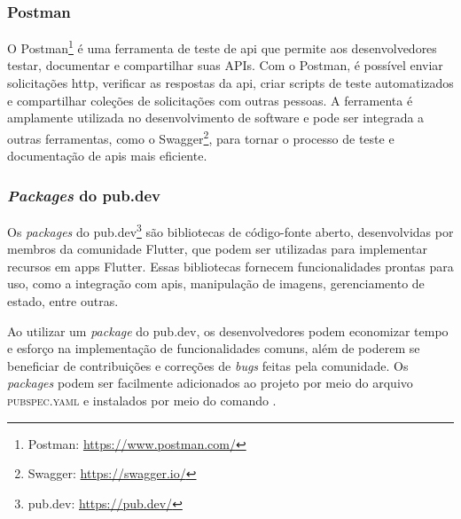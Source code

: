 \subsubsection{Postman}\label{sssec:postman}
O Postman\footnote{\label{postman}Postman: \url{https://www.postman.com/}} é uma ferramenta de teste de \ac{api} que permite aos desenvolvedores testar, documentar e compartilhar suas APIs. Com o Postman, é possível enviar solicitações \ac{http}, verificar as respostas da \ac{api}, criar scripts de teste automatizados e compartilhar coleções de solicitações com outras pessoas. A ferramenta é amplamente utilizada no desenvolvimento de software e pode ser integrada a outras ferramentas, como o Swagger\footnote{\label{swagger}Swagger: \url{https://swagger.io/}}, para tornar o processo de teste e documentação de \acp{api} mais eficiente.

\subsubsection{\textit{Packages} do pub.dev}\label{sssec:pubdev}
Os \textit{packages} do pub.dev\footnote{\label{pubdev}pub.dev: \url{https://pub.dev/}} são bibliotecas de código-fonte aberto, desenvolvidas por membros da comunidade Flutter, que podem ser utilizadas para implementar recursos em \acp{app} Flutter. Essas bibliotecas fornecem funcionalidades prontas para uso, como a integração com \acp{api}, manipulação de imagens, gerenciamento de estado, entre outras. 

Ao utilizar um \textit{package} do pub.dev, os desenvolvedores podem economizar tempo e esforço na implementação de funcionalidades comuns, além de poderem se beneficiar de contribuições e correções de \textit{bugs} feitas pela comunidade. Os \textit{packages} podem ser facilmente adicionados ao projeto por meio do arquivo \textsc{pubspec.yaml} e instalados por meio do comando .



